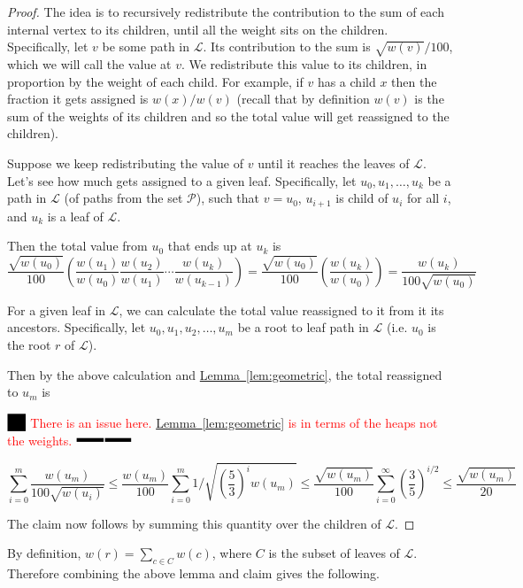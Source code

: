 \documentclass[11pt]{article}
\theoremstyle{definition}
\newcommand{\Lem}[1]{\hyperref[lem:#1]{Lemma~\ref*{lem:#1}}} %
\newcommand{\XSays}[2]{{
      {$\rule[-0.12cm]{0.2in}{0.5cm}$\fbox{\tt
            #1:} }
      \textcolor{red}{#2}
      \marginpar{\textcolor{blue}{#1}}
      {$\rule[0.1cm]{0.3in}{0.1cm}$\fbox{\tt
            end}$\rule[0.1cm]{0.3in}{0.1cm}$}
      }
   }
\newcommand{\Ben}[1]{{\XSays{Ben}{#1}}}
\newcommand{\pth}[2][\!]{#1\left({#2}\right)}
\begin{document}
\begin{proof}
The idea is to recursively redistribute the contribution to the sum of each internal vertex to its children, until all the weight sits on the children.
Specifically, let $v$ be some path in $\mathcal{L}$.  Its contribution to the sum is $\sqrt{w(v)}/100$, which we will call the value at $v$.  
We redistribute this value to its children, 
in proportion by the weight of each child.  For example, if $v$ has a child $x$ then the fraction it gets assigned is $w(x)/w(v)$ 
(recall that by definition $w(v)$ is the sum of the weights of its children and so the total value will get reassigned to the children).

Suppose we keep redistributing the value of $v$ until it reaches the leaves of $\mathcal{L}$.  Let's see how much gets assigned to a given leaf.
Specifically, let $u_0, u_1, \ldots, u_k$ be a path in $\mathcal{L}$ (of paths from the set $\mathcal{P}$), such that $v=u_0$,
$u_{i+1}$ is child of $u_i$ for all $i$, and $u_k$ is a leaf of $\mathcal{L}$.  

Then the total value from $u_0$ that ends up at $u_k$ is 
\[
\frac{\sqrt{w(u_0)}}{100} \pth{ \frac{w(u_1)}{w(u_0)} \frac{w(u_2)}{w(u_1)} \cdots \frac{w(u_k)}{w(u_{k-1})} }
= \frac{\sqrt{w(u_0)}}{100} \pth{ \frac{w(u_k)}{w(u_0)} } = \frac{w(u_k)}{100\sqrt{w(u_0)}}
\]

For a given leaf in $\mathcal{L}$, we can calculate the total value reassigned to it from it its ancestors.
Specifically, let $u_0, u_1, u_2, \dots, u_m$ be a root to leaf path in $\mathcal{L}$ (i.e. $u_0$ is the root $r$ of $\mathcal{L}$).

Then by the above calculation and \Lem{geometric}, the total reassigned to $u_m$ is 

\Ben{There is an issue here.  \Lem{geometric} is in terms of the heaps not the weights.}

\[
 \sum_{i=0}^m \frac{w(u_m)}{100\sqrt{w(u_i)}} \leq \frac{w(u_m)}{100} \sum_{i=0}^m 1 \Big/ \sqrt{\pth{\frac{5}{3}}^iw(u_m)} 
 \leq \frac{\sqrt{w(u_m)}}{100} \sum_{i=0}^{\infty} \pth{\frac{3}{5}}^{i/2} \leq \frac{\sqrt{w(u_m)}}{20}
\]

The claim now follows by summing this quantity over the children of $\mathcal{L}$.
\end{proof}

By definition, $w(r) = \sum_{c\in C} w(c)$, where $C$ is the subset of leaves of $\mathcal{L}$.  
Therefore combining the above lemma and claim gives the following.
\end{document}

